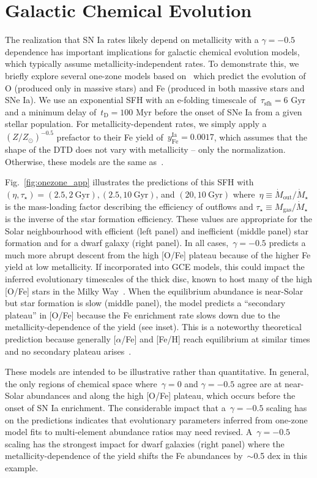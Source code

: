 \documentclass[ms.tex]{subfiles}
\begin{document}
\section{Galactic Chemical Evolution}
\label{sec:gce}

The realization that SN Ia rates likely depend on metallicity with a
$\gamma = -0.5$ dependence has important implications for galactic chemical
evolution models, which typically assume metallicity-independent rates.
To demonstrate this, we briefly explore several one-zone models based
on~\citet{Johnson2020} which predict the evolution of O (produced only in
massive stars) and Fe (produced in both massive stars and SNe Ia).
We use an exponential SFH with an e-folding timescale of~$\tau_\text{sfh} = 6$
Gyr and a minimum delay of~$t_\text{D} = 100$ Myr before the onset of SNe Ia
from a given stellar population.
For metallicity-dependent rates, we simply apply a~$(Z / Z_\odot)^{-0.5}$
prefactor to their Fe yield of~$y_\text{Fe}^\text{Ia} = 0.0017$, which assumes
that the shape of the DTD does not vary with metallicity -- only the
normalization.
Otherwise, these models are the same as~\citet{Johnson2020}.
\par
Fig.~\ref{fig:onezone_app} illustrates the predictions of this SFH with
$(\eta, \tau_\star) = (2.5, 2~\text{Gyr}), (2.5, 10~\text{Gyr})$, and
$(20, 10~\text{Gyr})$ where~$\eta \equiv \dot{M}_\text{out} / \dot{M}_\star$ is
the mass-loading factor describing the efficiency of outflows and
$\tau_\star \equiv M_\text{gas} / \dot{M}_\star$ is the inverse of the
star formation efficiency.
These values are appropriate for the Solar neighbourhood with efficient (left
panel) and inefficient (middle panel) star formation and for a dwarf galaxy
(right panel).
In all cases,~$\gamma = -0.5$ predicts a much more abrupt descent from the
high [O/Fe] plateau because of the higher Fe yield at low metallicity.
If incorporated into GCE models, this could impact the inferred evolutionary
timescales of the thick disc, known to host many of the high [O/Fe] stars in
the Milky Way~\citep{Hayden2017}.
When the equilibrium abundance is near-Solar but star formation is slow (middle
panel), the model predicts a ``secondary plateau'' in [O/Fe] because the Fe
enrichment rate slows down due to the metallicity-dependence of the yield
(see inset).
This is a noteworthy theoretical prediction because generally
[$\alpha$/Fe] and [Fe/H] reach equilibrium at similar times and no secondary
plateau arises~\citep[e.g.,][]{Weinberg2017}.
\par
These models are intended to be illustrative rather than quantitative.
In general, the only regions of chemical space where~$\gamma = 0$ and
$\gamma = -0.5$ agree are at near-Solar abundances and along the high [O/Fe]
plateau, which occurs before the onset of SN Ia enrichment.
The considerable impact that a~$\gamma = -0.5$ scaling has on the predictions
indicates that evolutionary parameters inferred from one-zone model fits to
multi-element abundance ratios may need revised.
A~$\gamma = -0.5$ scaling has the strongest impact for dwarf galaxies (right
panel) where the metallicity-dependence of the yield shifts the Fe abundances
by~$\sim$0.5 dex in this example.
\end{document}
